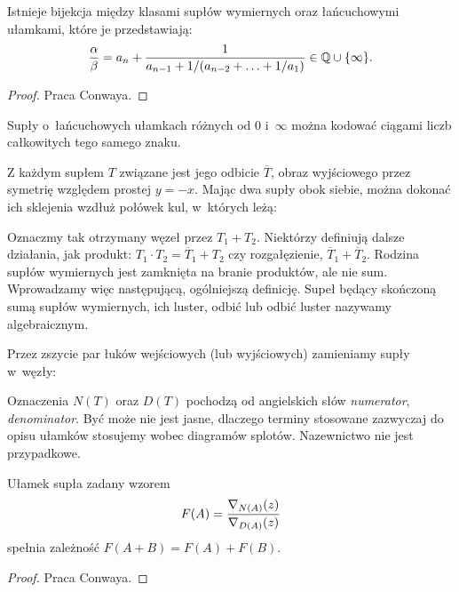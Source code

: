 \begin{proposition}
\label{prp:continued_fractions}
    Istnieje bijekcja między klasami supłów wymiernych oraz łańcuchowymi ułamkami, które je przedstawiają:
    \[
        \frac \alpha \beta = a_n + \frac{1}{a_{n-1} + 1 / (a_{n-2} +  \ldots + 1/a_1)} \in \mathbb Q \cup \{\infty\}.
    \]
\end{proposition}

\begin{proof}
    Praca \cite{conway70} Conwaya.
\end{proof}

\begin{proposition}
\label{prp:continued_fractions_2}
    Supły o~łańcuchowych ułamkach różnych od $0$ i~$\infty$ można kodować ciągami liczb całkowitych tego samego znaku.
\end{proposition}

Z każdym supłem $T$ związane jest jego odbicie $\overline T$, obraz wyjściowego przez symetrię względem prostej $y = -x$.
Mając dwa supły obok siebie, można dokonać ich sklejenia wzdłuż połówek kul, w~których leżą:


Oznaczmy tak otrzymany węzeł przez $T_1 + T_2$.
Niektórzy definiują dalsze działania, jak produkt: $T_1 \cdot T_2 = \overline T_1 + T_2$ czy rozgałęzienie, $\overline T_1 + \overline T_2$.
Rodzina supłów wymiernych jest zamknięta na branie produktów, ale nie sum.
Wprowadzamy więc następującą, ogólniejszą definicję.
Supeł będący skończoną sumą supłów wymiernych, ich luster, odbić lub odbić luster nazywamy algebraicznym.

Przez zszycie par łuków wejściowych (lub wyjściowych) zamieniamy supły w~węzły:


Oznaczenia $N(T)$ oraz $D(T)$ pochodzą od angielskich słów \emph{numerator}, \emph{denominator}.
Być może nie jest jasne, dlaczego terminy stosowane zazwyczaj do opisu ułamków stosujemy wobec diagramów splotów.
Nazewnictwo nie jest przypadkowe. %
\begin{proposition}
\label{prp:knot_fraction}
    Ułamek supła zadany wzorem
    \[
        F(A) = \frac{\nabla_{N(A)}(z)}{\nabla_{D(A)}(z)}
    \]
    spełnia zależność $F(A+B) = F(A) + F(B)$.
\end{proposition}

\begin{proof}
    Praca \cite{conway70} Conwaya.
\end{proof}


